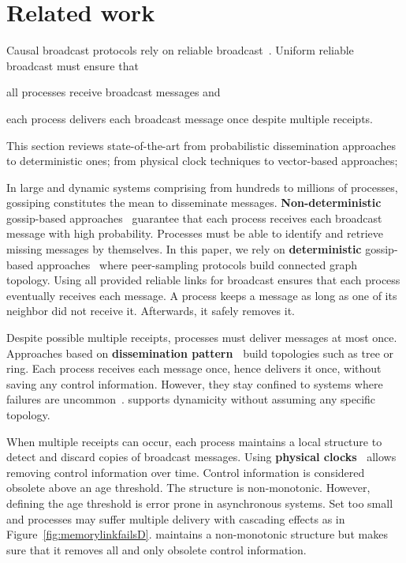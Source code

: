 
\section{Related work}
\label{sec:relatedwork}

Causal broadcast protocols rely on reliable
broadcast~\cite{hadzilacos1994modular}. Uniform reliable broadcast must ensure
that
\begin{inparaenum}[(i)]
\item all processes receive broadcast messages and
\item each process delivers each broadcast message once despite multiple
  receipts.
\end{inparaenum} This section reviews state-of-the-art from probabilistic
dissemination approaches to deterministic ones; from physical clock techniques
to vector-based approaches;

In large and dynamic systems comprising from hundreds to millions of processes,
gossiping constitutes the mean to disseminate
messages. \textbf{Non-deterministic} gossip-based
approaches~\cite{birman1999bimodal,demers1987epidemic} guarantee that each
process receives each broadcast message with high probability. Processes must be
able to identify and retrieve missing messages by themselves. In this paper, we
rely on \textbf{deterministic} gossip-based
approaches~\cite{friedman2004causal,nedelec2017adaptive} where peer-sampling
protocols build connected graph topology. Using all provided reliable links for
broadcast ensures that each process eventually receives each message. A process
keeps a message as long as one of its neighbor did not receive it. Afterwards,
it safely removes it.

Despite possible multiple receipts, processes must deliver messages at most
once. Approaches based on \textbf{dissemination
  pattern~\cite{bravo2017saturn,raynal2013distributed}} build topologies such as
tree or ring. Each process receives each message once, hence delivers it once,
without saving any control information. However, they stay confined to systems
where failures are uncommon~\cite{krasikova2016hashtable}. \RPCBROADCAST
supports dynamicity without assuming any specific topology. 

When multiple receipts can occur, each process maintains a local structure to
detect and discard copies of broadcast messages. Using \textbf{physical
  clocks~\cite{cachin2011introduction,demers1987epidemic}} allows removing
control information over time. Control information is considered obsolete above
an age threshold. The structure is non-monotonic. However, defining the age
threshold is error prone in asynchronous systems. Set too small and processes
may suffer multiple delivery with cascading effects as in
Figure~\ref{fig:memorylinkfailsD}.  \RPCBROADCAST maintains a non-monotonic
structure but makes sure that it removes all and only obsolete control
information.


